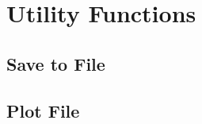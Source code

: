 \documentclass{article}%
\begin{document}
\section{Utility Functions}
\subsection{Save to File} \label{stf}

\subsection{Plot File} \label{plotfile}

\end{document}
